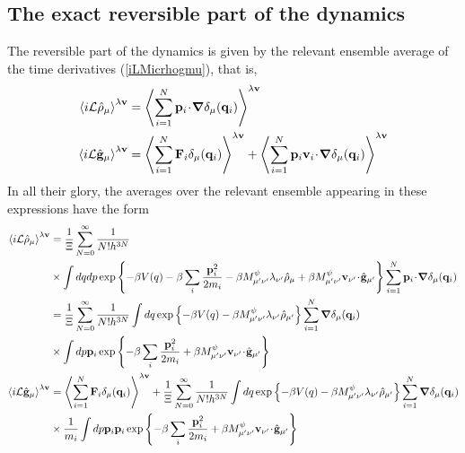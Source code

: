 \documentclass[b5paper,openright,10pt]{book}
\newcommand{\esc}{\!\cdot\!}
\newcommand{\llangle}{\left\langle}
\newcommand{\rrangle}{\right\rangle}
\begin{document}
\begin{appendices}
\section{The exact reversible part of the dynamics}
The reversible part of the dynamics  is given by the relevant ensemble
average of  the time derivatives
(\ref{iLMicrhogmu}), that is,
\begin{align}
  \llangle i{\cal L}\hat{\rho}_\mu\rrangle^{\lambda{\bf v}} &=\llangle \sum_{i=1}^N{\bf p}_i\esc\boldsymbol{\nabla}\delta_\mu({\bf q}_i)\rrangle^{\lambda{\bf v}}
\nonumber\\
  \llangle i{\cal L}\hat{\bf g}_\mu\rrangle^{\lambda{\bf v}} &=
  \llangle \sum_{i=1}^N{\bf F}_i\delta_\mu({\bf q}_i)\rrangle^{\lambda{\bf v}}
+  \llangle \sum_{i=1}^N{\bf p}_i{\bf v}_i\esc\boldsymbol{\nabla}\delta_\mu({\bf q}_i)\rrangle^{\lambda{\bf v}}
\end{align}
In all their glory, the  averages over the relevant ensemble appearing
in these expressions have the form
\begin{align}
  \llangle i{\cal L}\hat{\rho}_\mu\rrangle^{\lambda{\bf v}} &= 
\frac{1}{\Xi} \sum_{N=0}^\infty \frac{1}{N!h^{3N}} \nonumber\\
&\times \int dq dp 
\exp\left\{-\beta V(q)-\beta \sum_i\frac{{\bf p}_i^2}{2m_i}-\beta M^\psi_{\mu'\nu'}\lambda_{\nu'}\hat{\rho}_{\mu}+\beta M^\psi_{\mu'\nu' }{\bf v}_{\nu'}\esc\hat{\bf g}_{\mu'}\right\}\sum_{i=1}^N{\bf p}_i\esc\boldsymbol{\nabla}\delta_\mu({\bf q}_i)
\nonumber\\
&= 
\frac{1}{\Xi} \sum_{N=0}^\infty \frac{1}{N!h^{3N}}\int dq  
\exp\left\{-\beta V(q)-\beta M^\psi_{\mu'\nu'}\lambda_{\nu'} \hat{\rho}_{\mu'}\right\}\sum_{i=1}^N\boldsymbol{\nabla}\delta_\mu({\bf q}_i)
\nonumber\\
&\times \int dp{\bf p}_i\exp\left\{-\beta \sum_i\frac{{\bf p}_i^2}{2m_i}+\beta M^\psi_{\mu'\nu'}{\bf v}_{\nu'}\esc\hat{\bf g}_{\mu'}\right\}
\nonumber\\
  \llangle i{\cal L}\hat{\bf g}_\mu\rrangle^{\lambda{\bf v}} &=
  \llangle \sum_{i=1}^N{\bf F}_i\delta_\mu({\bf q}_i)\rrangle^{\lambda{\bf v}}
+\frac{1}{\Xi} \sum_{N=0}^\infty \frac{1}{N!h^{3N}}\int dq 
\exp\left\{-\beta V(q)-\beta M^\psi_{\mu'\nu'}\lambda_{\nu'}\hat{\rho}_{\mu'}\right\}\sum_{i=1}^N\boldsymbol{\nabla}\delta_\mu({\bf q}_i)
\nonumber\\
&\times\frac{1}{m_i} \int dp{\bf p}_i{\bf p}_i\exp\left\{-\beta \sum_i\frac{{\bf p}_i^2}{2m_i}+\beta M^\psi_{\mu'\nu' }{\bf v}_{\nu'}\esc\hat{\bf g}_{\mu'}\right\}

\end{align}
\end{appendices}
\end{document}
